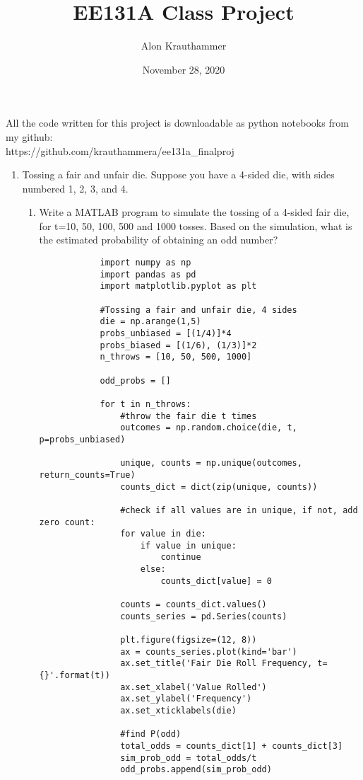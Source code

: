 \documentclass[]{article}
\title{EE131A Class Project}
\author{Alon Krauthammer}
\date{November 28, 2020}
\begin{document}
\maketitle

All the code written for this project is downloadable as python notebooks from my github:\\

https://github.com/krauthammera/ee131a_finalproj

\begin{enumerate}
	\item Tossing  a  fair  and  unfair  die. Suppose  you  have  a  4-sided  die,  with  sides numbered 1, 2, 3, and 4.
	\begin{enumerate}
		\item Write a MATLAB program to simulate the tossing of a 4-sided fair die, for t=10, 50, 100, 500 and 1000  tosses. Based on the simulation, what is the  estimated probability of obtaining an odd number?\\
		
		\begin{lstlisting}
			import numpy as np
			import pandas as pd
			import matplotlib.pyplot as plt
			
			#Tossing a fair and unfair die, 4 sides
			die = np.arange(1,5)
			probs_unbiased = [(1/4)]*4
			probs_biased = [(1/6), (1/3)]*2
			n_throws = [10, 50, 500, 1000]
			
			odd_probs = []
			
			for t in n_throws:
			    #throw the fair die t times
			    outcomes = np.random.choice(die, t, p=probs_unbiased) 
			
			    unique, counts = np.unique(outcomes, return_counts=True)
			    counts_dict = dict(zip(unique, counts))
			
			    #check if all values are in unique, if not, add zero count:
			    for value in die:
			        if value in unique:
			            continue
		        	else:
			            counts_dict[value] = 0
			
			    counts = counts_dict.values()
			    counts_series = pd.Series(counts)
			
			    plt.figure(figsize=(12, 8))
			    ax = counts_series.plot(kind='bar')
			    ax.set_title('Fair Die Roll Frequency, t={}'.format(t))
			    ax.set_xlabel('Value Rolled')
			    ax.set_ylabel('Frequency')
			    ax.set_xticklabels(die)
			
			    #find P(odd)
			    total_odds = counts_dict[1] + counts_dict[3]
			    sim_prob_odd = total_odds/t
			    odd_probs.append(sim_prob_odd)
			

\end{lstlisting}
\end{enumerate}
\end{enumerate}
\end{document}
